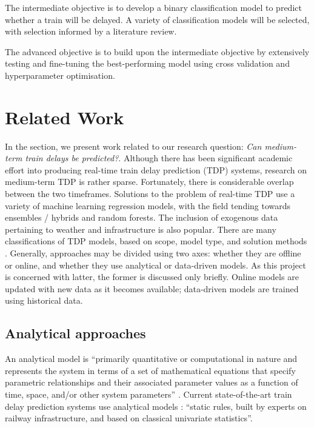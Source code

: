 \documentclass[12pt,a4paper]{article}
\begin{document}
The intermediate objective is to develop a binary classification model to predict whether a train will be delayed. A variety of classification models will be selected, with selection informed by a literature review.

The advanced objective is to build upon the intermediate objective by extensively testing and fine-tuning the best-performing model using cross validation and hyperparameter optimisation.

\section{Related Work}
\label{section:related_work}

In the section, we present work related to our research question: \textit{Can medium-term train delays be predicted?}. Although there has been significant academic effort into producing real-time train delay prediction (TDP) systems, research on medium-term TDP is rather sparse. Fortunately, there is considerable overlap between the two timeframes. Solutions to the problem of real-time TDP use a variety of machine learning regression models, with the field tending towards ensembles / hybrids  and random forests. The inclusion of exogenous data pertaining to weather and infrastructure is also popular.  There are many classifications of TDP models, based on scope, model type, and solution methods \cite{markovic_et_al_2015}. Generally, approaches may be divided using two axes: whether they are offline or online, and whether they use analytical or data-driven models. As this project is concerned with latter, the former is discussed only briefly. Online models are updated with new data as it becomes available; data-driven models are trained using historical data.

\subsection{Analytical approaches}

An analytical model is “primarily quantitative or computational in nature and represents the system in terms of a set of mathematical equations that specify parametric relationships and their associated parameter values as a function of time, space, and/or other system parameters” \cite{friedenthal_moore_steiner_2012}. Current state-of-the-art train delay prediction systems use analytical models \cite{oneto_et_al_2016}: “static rules, built by experts on railway infrastructure, and based on classical univariate statistics”.
\end{document}
